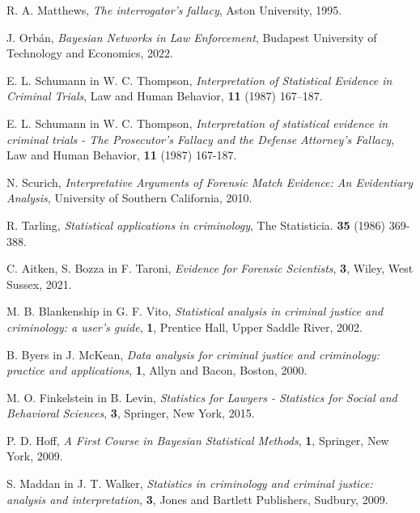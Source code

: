 \documentclass{beamer}
\begin{document}
\begin{frame}
    \begin{thebibliography}{99}
        R. A. Matthews, \emph{The interrogator’s fallacy}, Aston University, 1995.

        J. Orbán, \emph{Bayesian Networks in Law Enforcement}, Budapest University of Technology and Economics, 2022.

        E. L. Schumann in W. C. Thompson, \emph{Interpretation of Statistical Evidence in Criminal Trials}, Law and Human Behavior, \textbf{11} (1987) 167–187.

        E. L. Schumann in W. C. Thompson, \emph{Interpretation of statistical evidence in criminal trials - The Prosecutor's Fallacy and the Defense Attorney's Fallacy}, Law and Human Behavior, \textbf{11} (1987) 167-187.

        N. Scurich, \emph{Interpretative Arguments of Forensic Match Evidence: An Evidentiary Analysis}, University of Southern California, 2010.

        R. Tarling, \emph{Statistical applications in criminology}, The Statisticia. \textbf{35} (1986) 369-388.
    \end{thebibliography}
\end{frame}

\begin{frame}
    \begin{thebibliography}{99}
        C. Aitken, S. Bozza in F. Taroni, \emph{Evidence for Forensic Scientists}, \textbf{3}, Wiley, West Sussex, 2021.

        M. B. Blankenship in G. F. Vito, \emph{Statistical analysis in criminal justice and criminology: a user's guide}, \textbf{1}, Prentice Hall, Upper Saddle River, 2002.

        B. Byers in J. McKean, \emph{Data analysis for criminal justice and criminology: practice and applications}, \textbf{1}, Allyn and Bacon, Boston, 2000.

        M. O. Finkelstein in B. Levin, \emph{Statistics for Lawyers - Statistics for Social and Behavioral Sciences}, \textbf{3}, Springer, New York, 2015.

        P. D. Hoff, \emph{A First Course in Bayesian Statistical Methods}, \textbf{1}, Springer, New York, 2009.

        S. Maddan in J. T. Walker, \emph{Statistics in criminology and criminal justice: analysis and interpretation}, \textbf{3}, Jones and Bartlett Publishers, Sudbury, 2009.
    \end{thebibliography}
\end{frame}
\end{document}

